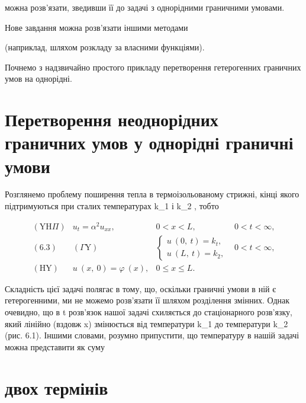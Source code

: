 \documentclass[
  ukrainian,
]{article}
\begin{document}
можна розв'язати, зведивши її до задачі з однорідними граничними
умовами.

Нове завдання можна розв'язати іншими методами

(наприклад, шляхом розкладу за власними функціями).

Почнемо з надзвичайно простого прикладу перетворення гетерогенних
граничних умов на однорідні.

\section{Перетворення неоднорідних граничних умов у однорідні граничні
умови}\label{ux43fux435ux440ux435ux442ux432ux43eux440ux435ux43dux43dux44f-ux43dux435ux43eux434ux43dux43eux440ux456ux434ux43dux438ux445-ux433ux440ux430ux43dux438ux447ux43dux438ux445-ux443ux43cux43eux432-ux443-ux43eux434ux43dux43eux440ux456ux434ux43dux456-ux433ux440ux430ux43dux438ux447ux43dux456-ux443ux43cux43eux432ux438}

Розглянемо проблему поширення тепла в термоізольованому стрижні, кінці
якого підтримуються при сталих температурах k\_1 і k\_2 , тобто

\[
\begin{aligned} (\mathrm{Y}\mathrm{H}\Pi) & u_t = \alpha^2 u_{xx}, & 0 < x < L, & 0 < t < \infty, \\ (6.3) & (\Gamma\mathrm{Y}) & \begin{cases} u \ (0, \ t) = k_t, \\ u \ (L, \ t) = k_2, \end{cases} & 0 < t < \infty, \\ (\mathrm{H}\mathrm{Y}) & u \ (x, \ 0) = \varphi \ (x), & 0 \leqslant x \leqslant L. \end{aligned}
\]

Складність цієї задачі полягає в тому, що, оскільки граничні умови в ній
є гетерогенними, ми не можемо розв'язати її шляхом розділення змінних.
Однак очевидно, що в t \to \infty розв'язок нашої задачі схиляється до
стаціонарного розв'язку, який лінійно (вздовж x) змінюється від
температури k\_1 до температури k\_2 (рис. 6.1). Іншими словами, розумно
припустити, що температуру в нашій задачі можна представити як суму

\section{двох
термінів}\label{ux434ux432ux43eux445-ux442ux435ux440ux43cux456ux43dux456ux432}
\end{document}
